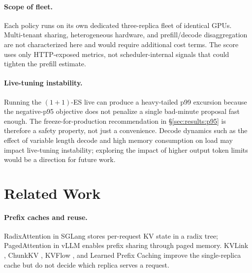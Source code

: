 \documentclass{article}
\begin{document}
\paragraph{Scope of fleet.}
Each policy runs on its own dedicated three-replica fleet of identical GPUs. Multi-tenant sharing, heterogeneous hardware, and prefill/decode disaggregation \citep{distserve2024,splitwise2024} are not characterized here and would require additional cost terms. The score uses only HTTP-exposed metrics, not scheduler-internal signals \citep{kvflow2025,lpc2025} that could tighten the prefill estimate.

\paragraph{Live-tuning instability.}
Running the $(1{+}1)$-ES live can produce a heavy-tailed p99 excursion
because the negative-p95 objective does not penalize a single
bad-minute proposal fast enough. The freeze-for-production recommendation in
\S\ref{sec:results:p95} is therefore a safety property, not just a
convenience. Decode dynamics such as the effect of variable length decode and high memory consumption on load may impact live-tuning instability; exploring the impact of higher output token limits would be a direction for future work.

\section{Related Work}
\label{sec:related}

\paragraph{Prefix caches and reuse.}
RadixAttention in SGLang \citep{sglang2024} stores per-request KV state in a
radix tree; PagedAttention in vLLM \citep{vllm2023} enables prefix sharing
through paged memory. KVLink \citep{kvlink2025}, ChunkKV \citep{chunkkv2025},
KVFlow \citep{kvflow2025}, and Learned Prefix Caching \citep{lpc2025} improve
the single-replica cache but do not decide which replica serves a request.
\end{document}

